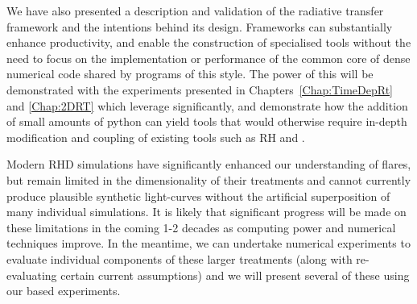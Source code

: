 We have also presented a description and validation of the \Lw{} radiative transfer framework and the intentions behind its design.
Frameworks can substantially enhance productivity, and enable the construction of specialised tools without the need to focus on the implementation or performance of the common core of dense numerical code shared by programs of this style.
The power of this will be demonstrated with the experiments presented in Chapters~\ref{Chap:TimeDepRt} and \ref{Chap:2DRT} which leverage \Lw{} significantly, and demonstrate how the addition of small amounts of python can yield tools that would otherwise require in-depth modification and coupling of existing tools such as RH and \Radyn{}.

Modern RHD simulations have significantly enhanced our understanding of flares, but remain limited in the dimensionality of their treatments and cannot currently produce plausible synthetic light-curves without the artificial superposition of many individual simulations.
It is likely that significant progress will be made on these limitations in the coming 1-2 decades as computing power and numerical techniques improve.
In the meantime, we can undertake numerical experiments to evaluate individual components of these larger treatments (along with re-evaluating certain current assumptions) and we will present several of these using our \Lw{} based experiments.